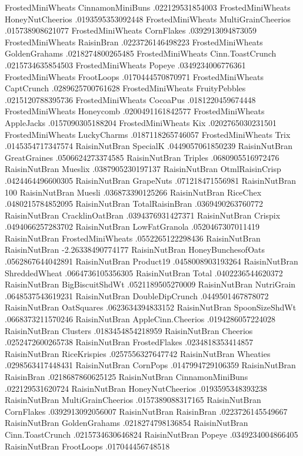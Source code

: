 FrostedMiniWheats	CinnamonMiniBuns	.022129531854003
FrostedMiniWheats	HoneyNutCheerios	.0193595353092448
FrostedMiniWheats	MultiGrainCheerios	.015738908621077
FrostedMiniWheats	CornFlakes	.0392913094873059
FrostedMiniWheats	RaisinBran	.0223726146498223
FrostedMiniWheats	GoldenGrahams	.0218274800265485
FrostedMiniWheats	Cinn.ToastCrunch	.0215734635854503
FrostedMiniWheats	Popeye	.0349234006776361
FrostedMiniWheats	FrootLoops	.0170444570870971
FrostedMiniWheats	CaptCrunch	.0289625700761628
FrostedMiniWheats	FruityPebbles	.0215120788395736
FrostedMiniWheats	CocoaPus	.0181220459674448
FrostedMiniWheats	Honeycomb	.0200491161842577
FrostedMiniWheats	AppleJacks	.0157090305188204
FrostedMiniWheats	Kix	.0202765030231501
FrostedMiniWheats	LuckyCharms	.0187118265746057
FrostedMiniWheats	Trix	.0145354717347574
RaisinNutBran	SpecialK	.0449057061850239
RaisinNutBran	GreatGraines	.0506624273374585
RaisinNutBran	Triples	.0680905516972476
RaisinNutBran	Mueslix	.0387905230197137
RaisinNutBran	OtmlRaisinCrisp	.0424464496600305
RaisinNutBran	GrapeNuts	.071218471556981
RaisinNutBran	100%
RaisinNutBran	Muesli	.036873390125266
RaisinNutBran	RiceChex	.0480215784852095
RaisinNutBran	TotalRaisinBran	.0369490263760772
RaisinNutBran	CracklinOatBran	.0394376931427371
RaisinNutBran	Crispix	.0494066257283702
RaisinNutBran	LowFatGranola	.0520467307011419
RaisinNutBran	FrostedMiniWheats	.0552265122298436
RaisinNutBran	RaisinNutBran	-2.26338490774177
RaisinNutBran	HoneyBunchesofOats	.0562867644042891
RaisinNutBran	Product19	.0458008903193264
RaisinNutBran	ShreddedWheat	.0664736105356305
RaisinNutBran	Total	.0402236544620372
RaisinNutBran	BigBiscuitShdWt	.0521189505270009
RaisinNutBran	NutriGrain	.0648537543619231
RaisinNutBran	DoubleDipCrunch	.0449501467878072
RaisinNutBran	OatSquares	.0623634394833152
RaisinNutBran	SpoonSizeShdWt	.0668373211570246
RaisinNutBran	AppleCinn.Cheerios	.0194286057224028
RaisinNutBran	Clusters	.0183454854218959
RaisinNutBran	Cheerios	.0252472600265738
RaisinNutBran	FrostedFlakes	.0234818353414857
RaisinNutBran	RiceKrispies	.0257556327647742
RaisinNutBran	Wheaties	.0298563417448431
RaisinNutBran	CornPops	.0147994729106359
RaisinNutBran	RaisinBran	.0218687860625125
RaisinNutBran	CinnamonMiniBuns	.022129531620724
RaisinNutBran	HoneyNutCheerios	.0193595348393238
RaisinNutBran	MultiGrainCheerios	.0157389088317165
RaisinNutBran	CornFlakes	.0392913092056007
RaisinNutBran	RaisinBran	.0223726145549667
RaisinNutBran	GoldenGrahams	.0218274798136854
RaisinNutBran	Cinn.ToastCrunch	.0215734630646824
RaisinNutBran	Popeye	.0349234004866405
RaisinNutBran	FrootLoops	.017044456748518
